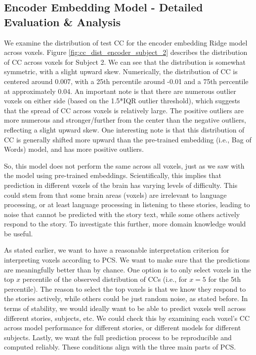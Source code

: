 \documentclass[10pt,letterpaper]{article}
\begin{document}
\subsection{Encoder Embedding Model - Detailed Evaluation \& Analysis}
We examine the distribution of test CC for the encoder embedding Ridge model across voxels. Figure \ref{fig:cc_dist_encoder_subject_2} describes the distribution of CC across voxels for Subject 2. We can see that the distribution is somewhat symmetric, with a slight upward skew. Numerically, the distribution of CC is centered around 0.007, with a 25th percentile around -0.01 and a 75th percentile at approximately 0.04. An important note is that there are numerous outlier voxels on either side (based on the 1.5*IQR outlier threshold), which suggests that the spread of CC across voxels is relatively large. The positive outliers are more numerous and stronger/further from the center than the negative outliers, reflecting a slight upward skew. One interesting note is that this distribution of CC is generally shifted more upward than the pre-trained embedding (i.e., Bag of Words) model, and has more positive outliers.

So, this model does not perform the same across all voxels, just as we saw with the model using pre-trained embeddings. Scientifically, this implies that prediction in different voxels of the brain has varying levels of difficulty. This could stem from that some brain areas (voxels) are irrelevant to language processing, or at least language processing in listening to these stories, leading to noise that cannot be predicted with the story text, while some others actively respond to the story. To investigate this further, more domain knowledge would be useful.

As stated earlier, we want to have a reasonable interpretation criterion for interpreting voxels according to PCS. We want to make sure that the predictions are meaningfully better than by chance. One option is to only select voxels in the top \(x\) percentile of the observed distribution of CCs (i.e., for \(x=5\) for the 5th percentile). The reason to select the top voxels is that we know they respond to the stories actively, while others could be just random noise, as stated before. In terms of stability, we would ideally want to be able to predict voxels well across different stories, subjects, etc. We could check this by examining each voxel's CC across model performance for different stories, or different models for different subjects. Lastly, we want the full prediction process to be reproducible and computed reliably. These conditions align with the three main parts of PCS.
\end{document}
